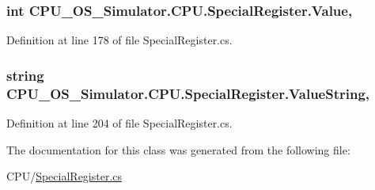 \subsubsection[{Value}]{\setlength{\rightskip}{0pt plus 5cm}int C\+P\+U\+\_\+\+O\+S\+\_\+\+Simulator.\+C\+P\+U.\+Special\+Register.\+Value\hspace{0.3cm}{\ttfamily [get]}, {\ttfamily [set]}}\label{class_c_p_u___o_s___simulator_1_1_c_p_u_1_1_special_register_aeff33618d376eeaef1e62d6833074bd4}


Definition at line 178 of file Special\+Register.\+cs.

\hypertarget{class_c_p_u___o_s___simulator_1_1_c_p_u_1_1_special_register_a60a2bcd516cedf8bb485c2e36bbc3235}{}
\subsubsection[{Value\+String}]{\setlength{\rightskip}{0pt plus 5cm}string C\+P\+U\+\_\+\+O\+S\+\_\+\+Simulator.\+C\+P\+U.\+Special\+Register.\+Value\+String\hspace{0.3cm}{\ttfamily [get]}, {\ttfamily [set]}}\label{class_c_p_u___o_s___simulator_1_1_c_p_u_1_1_special_register_a60a2bcd516cedf8bb485c2e36bbc3235}


Definition at line 204 of file Special\+Register.\+cs.



The documentation for this class was generated from the following file\+:\begin{DoxyCompactItemize}
\item 
C\+P\+U/\hyperlink{_special_register_8cs}{Special\+Register.\+cs}\end{DoxyCompactItemize}

